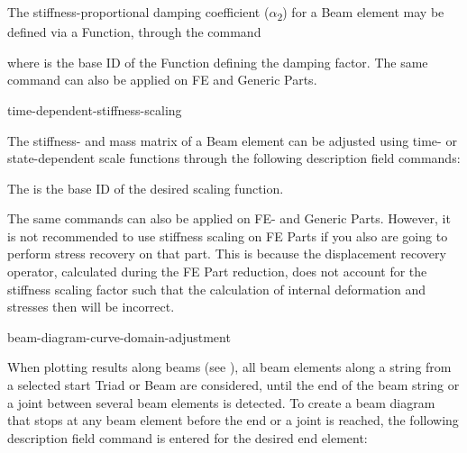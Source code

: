 

The stiffness-proportional damping coefficient ($\alpha$\textsubscript{2}) for
a Beam element may be defined via a Function, through the command


\noindent
where {\tt{}} is the base ID of the Function defining the damping
factor. The same command can also be applied on FE and Generic Parts.



           {time-dependent-stiffness-scaling}

The stiffness- and mass matrix of a Beam element can be adjusted using
time- or state-dependent scale functions through the following
description field commands:



\noindent
The {\tt{}} is the base ID of the desired scaling function.

The same commands can also be applied on FE- and Generic Parts.
However, it is not recommended to use stiffness scaling on FE Parts
if you also are going to perform stress recovery on that part.
This is because the displacement recovery operator, calculated during
the FE Part reduction, does not account for the stiffness scaling factor
such that the calculation of internal deformation and stresses then
will be incorrect.


           {beam-diagram-curve-domain-adjustment}

When plotting results along beams
(see ), all beam elements
along a string from a selected start Triad or Beam are considered, until the
end of the beam string or a joint between several beam elements is detected.
To create a beam diagram that stops at any beam element before the end
or a joint is reached, the following description field command is entered
for the desired end element:

